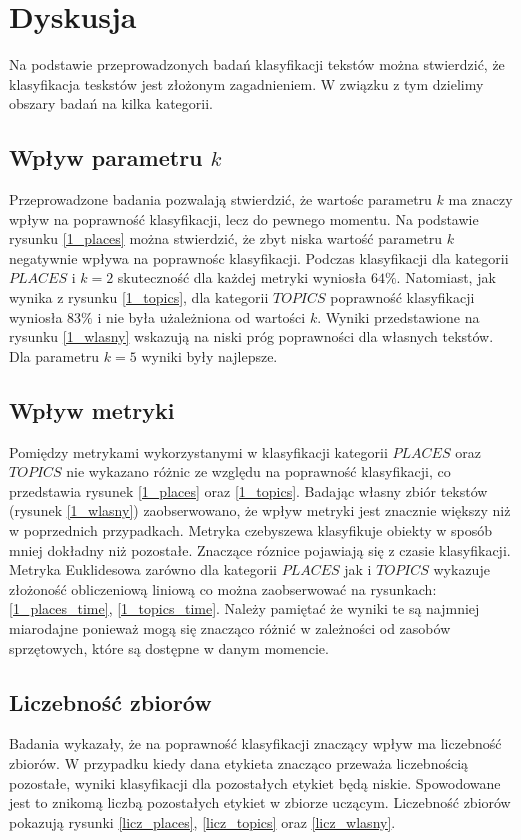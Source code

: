 \documentclass{classrep}
\begin{document}
\section{Dyskusja}
Na podstawie przeprowadzonych badań klasyfikacji tekstów można stwierdzić, że klasyfikacja teskstów
jest złożonym zagadnieniem. W związku z tym dzielimy obszary badań na kilka kategorii.

\subsection{Wpływ parametru $k$}
Przeprowadzone badania pozwalają stwierdzić, że wartośc parametru $k$ ma znaczy wpływ na poprawność
klasyfikacji, lecz do pewnego momentu. Na podstawie rysunku \ref{1_places} można stwierdzić, że
zbyt niska wartość parametru $k$ negatywnie wpływa na poprawnośc klasyfikacji. Podczas klasyfikacji
dla kategorii $PLACES$ i $k=2$ skuteczność dla każdej metryki wyniosła $64\%$. Natomiast, jak wynika
z rysunku \ref{1_topics}, dla
kategorii $TOPICS$ poprawność klasyfikacji wyniosła $83\%$ i nie była użależniona od wartości $k$.
Wyniki przedstawione na rysunku \ref{1_wlasny} wskazują na niski próg poprawności dla własnych tekstów.
Dla parametru $k=5$ wyniki były najlepsze.


\subsection{Wpływ metryki}
Pomiędzy metrykami wykorzystanymi w klasyfikacji kategorii $PLACES$ oraz $TOPICS$ nie wykazano
różnic ze względu na
poprawność klasyfikacji, co przedstawia rysunek \ref{1_places} oraz \ref{1_topics}. Badając własny
zbiór tekstów (rysunek \ref{1_wlasny}) zaobserwowano, że wpływ metryki jest znacznie większy niż w poprzednich przypadkach.
Metryka czebyszewa klasyfikuje obiekty w sposób mniej dokładny niż pozostałe.
Znaczące róznice
pojawiają się z czasie klasyfikacji. Metryka Euklidesowa zarówno dla kategorii $PLACES$ jak i $TOPICS$
wykazuje złożoność obliczeniową liniową co można zaobserwować na rysunkach: \ref{1_places_time},
\ref{1_topics_time}. Należy pamiętać że wyniki te są najmniej miarodajne ponieważ mogą się znacząco
różnić w zależności od zasobów sprzętowych, które są dostępne w danym momencie.

\subsection{Liczebność zbiorów}
Badania wykazały, że na poprawność klasyfikacji znaczący wpływ ma liczebność zbiorów. W przypadku
kiedy dana etykieta znacząco przeważa liczebnością pozostałe, wyniki klasyfikacji dla pozostałych
etykiet będą niskie. Spowodowane jest to znikomą liczbą pozostałych etykiet w zbiorze uczącym.
Liczebność zbiorów pokazują rysunki \ref{licz_places}, \ref{licz_topics} oraz \ref{licz_wlasny}.
\end{document}
